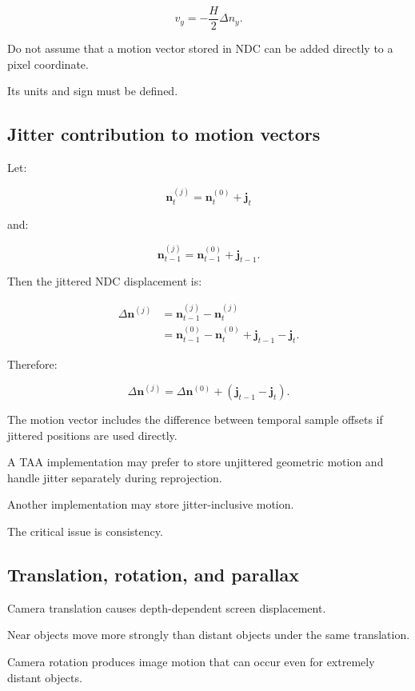 \[
 \boxed{ v_y=-\frac H2\Delta n_y }.
\]

Do not assume that a motion vector stored in NDC can be added directly to a pixel coordinate.

Its units and sign must be defined.

\subsection{Jitter contribution to motion vectors}\label{02-foundations-ii-ch036-jitter-contribution-to-motion-vectors}

Let:

\[
 \mathbf n_t^{(j)}= \mathbf n_t^{(0)}+\mathbf j_t
\]

and:

\[
 \mathbf n_{t-1}^{(j)}= \mathbf n_{t-1}^{(0)}+\mathbf j_{t-1}.
\]

Then the jittered NDC displacement is:

\[
 \begin{aligned} \Delta\mathbf n^{(j)} &= \mathbf n_{t-1}^{(j)}-\mathbf n_t^{(j)}\\ &= \mathbf n_{t-1}^{(0)}-\mathbf n_t^{(0)} +\mathbf j_{t-1}-\mathbf j_t. \end{aligned}
\]

Therefore:

\[
 \boxed{ \Delta\mathbf n^{(j)} = \Delta\mathbf n^{(0)} + (\mathbf j_{t-1}-\mathbf j_t) }.
\]

The motion vector includes the difference between temporal sample offsets if jittered positions are used directly.

A TAA implementation may prefer to store unjittered geometric motion and handle jitter separately during reprojection.

Another implementation may store jitter-inclusive motion.

The critical issue is consistency.

\subsection{Translation, rotation, and parallax}\label{02-foundations-ii-ch036-translation-rotation-and-parallax}

Camera translation causes depth-dependent screen displacement.

Near objects move more strongly than distant objects under the same translation.

Camera rotation produces image motion that can occur even for extremely distant objects.

